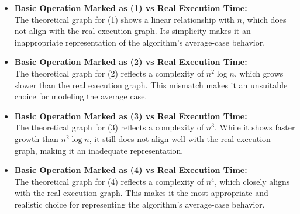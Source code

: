 \documentclass[11pt, oneside, a4paper]{article}
\begin{document}
\begin{itemize}
    \item \textbf{Basic Operation Marked as (1) vs Real Execution Time:} \\
    The theoretical graph for (1) shows a linear relationship with \(n\), which does not align with the real execution graph. Its simplicity makes it an inappropriate representation of the algorithm’s average-case behavior.

    \item \textbf{Basic Operation Marked as (2) vs Real Execution Time:} \\
    The theoretical graph for (2) reflects a complexity of \(n^2 \log n\), which grows slower than the real execution graph. This mismatch makes it an unsuitable choice for modeling the average case.

    \item \textbf{Basic Operation Marked as (3) vs Real Execution Time:} \\
    The theoretical graph for (3) reflects a complexity of \(n^3\). While it shows faster growth than \(n^2 \log n\), it still does not align well with the real execution graph, making it an inadequate representation.

    \item \textbf{Basic Operation Marked as (4) vs Real Execution Time:} \\
    The theoretical graph for (4) reflects a complexity of \(n^4\), which closely aligns with the real execution graph. This makes it the most appropriate and realistic choice for representing the algorithm’s average-case behavior.
\end{itemize}
\end{document}
